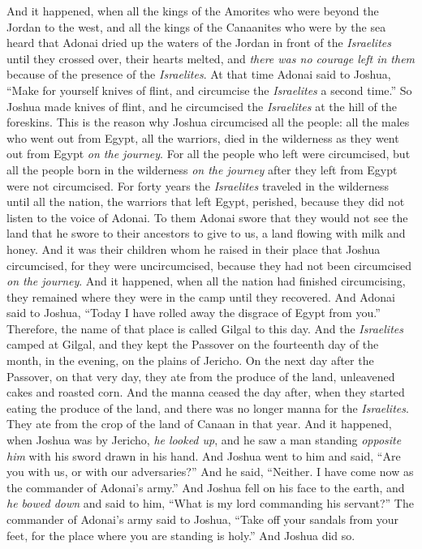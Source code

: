 \begin{biblechapter} %
 And it happened, when all the kings of the Amorites who were beyond the Jordan to the west, and all the kings of the Canaanites who were by the sea heard that Adonai dried up the waters of the Jordan in front of the \textit{Israelites} until they crossed over, their hearts melted, and \textit{there was no courage left in them} because of the presence of the \textit{Israelites}. 
\verse At that time Adonai said to Joshua, “Make for yourself knives of flint, and circumcise the \textit{Israelites} a second time.”
\verse So Joshua made knives of flint, and he circumcised the \textit{Israelites} at the hill of the foreskins.
\verse This is the reason why Joshua circumcised all the people: all the males who went out from Egypt, all the warriors, died in the wilderness as they went out from Egypt \textit{on the journey}.
\verse For all the people who left were circumcised, but all the people born in the wilderness \textit{on the journey} after they left from Egypt were not circumcised.
\verse For forty years the \textit{Israelites} traveled in the wilderness until all the nation, the warriors that left Egypt, perished, because they did not listen to the voice of Adonai. To them Adonai swore that they would not see the land that he swore to their ancestors to give to us, a land flowing with milk and honey.
\verse And it was their children whom he raised in their place that Joshua circumcised, for they were uncircumcised, because they had not been circumcised \textit{on the journey}.
 And it happened, when all the nation had finished circumcising, they remained where they were in the camp until they recovered.
\verse And Adonai said to Joshua, “Today I have rolled away the disgrace of Egypt from you.” Therefore, the name of that place is called Gilgal to this day.
\verse And the \textit{Israelites} camped at Gilgal, and they kept the Passover on the fourteenth day of the month, in the evening, on the plains of Jericho.
\verse On the next day after the Passover, on that very day, they ate from the produce of the land, unleavened cakes and roasted corn.
\verse And the manna ceased the day after, when they started eating the produce of the land, and there was no longer manna for the \textit{Israelites}. They ate from the crop of the land of Canaan in that year.
 And it happened, when Joshua was by Jericho, \textit{he looked up}, and he saw a man standing \textit{opposite him} with his sword drawn in his hand. And Joshua went to him and said, “Are you with us, or with our adversaries?”
\verse And he said, “Neither. I have come now as the commander of Adonai’s army.” And Joshua fell on his face to the earth, and \textit{he bowed down} and said to him, “What is my lord commanding his servant?”
\verse The commander of Adonai’s army said to Joshua, “Take off your sandals from your feet, for the place where you are standing is holy.” And Joshua did so.
\end{biblechapter}

